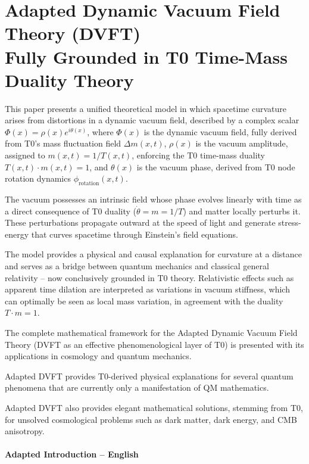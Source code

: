 \chapter{Adapted Dynamic Vacuum Field Theory (DVFT)\\ 
	Fully Grounded in T0 Time-Mass Duality Theory}

	
	
	\begin{t0box}[Summary]
		This paper presents a unified theoretical model in which spacetime curvature arises from distortions in a dynamic vacuum field, described by a complex scalar $\Phi(x)=\rho(x)e^{i\theta(x)}$, where $\Phi(x)$ is the dynamic vacuum field, fully derived from T0's mass fluctuation field $\Delta m(x,t)$, $\rho(x)$ is the vacuum amplitude, assigned to $m(x,t) = 1/T(x,t)$, enforcing the T0 time-mass duality $T(x,t) \cdot m(x,t) = 1$, and $\theta(x)$ is the vacuum phase, derived from T0 node rotation dynamics $\phi_{\text{rotation}}(x,t)$.
		
		The vacuum possesses an intrinsic field whose phase evolves linearly with time as a direct consequence of T0 duality ($\dot{\theta} = m = 1/T$) and matter locally perturbs it. These perturbations propagate outward at the speed of light and generate stress-energy that curves spacetime through Einstein's field equations.
		
		The model provides a physical and causal explanation for curvature at a distance and serves as a bridge between quantum mechanics and classical general relativity – now conclusively grounded in T0 theory. Relativistic effects such as apparent time dilation are interpreted as variations in vacuum stiffness, which can optimally be seen as local mass variation, in agreement with the duality $T \cdot m = 1$.
		
		The complete mathematical framework for the Adapted Dynamic Vacuum Field Theory (DVFT as an effective phenomenological layer of T0) is presented with its applications in cosmology and quantum mechanics.
		
		Adapted DVFT provides T0-derived physical explanations for several quantum phenomena that are currently only a manifestation of QM mathematics.
		
		Adapted DVFT also provides elegant mathematical solutions, stemming from T0, for unsolved cosmological problems such as dark matter, dark energy, and CMB anisotropy.
	\end{t0box}
	
	\subsubsection{Adapted Introduction – English}
	
